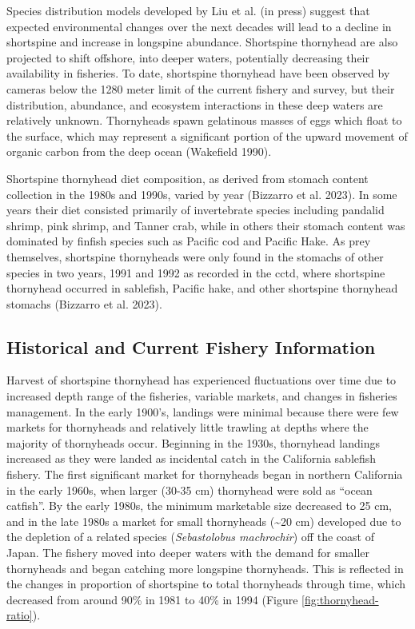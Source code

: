 \documentclass[11pt,
  english,
  letterpaper,
]{article}
\begin{document}
Species distribution models developed by Liu et al. (in press) suggest that expected environmental changes over the next decades will lead to a decline in shortspine and increase in longspine abundance. Shortspine thornyhead are also projected to shift offshore, into deeper waters, potentially decreasing their availability in fisheries. To date, shortspine thornyhead have been observed by cameras below the 1280 meter limit of the current fishery and survey, but their distribution, abundance, and ecosystem interactions in these deep waters are relatively unknown. Thornyheads spawn gelatinous masses of eggs which float to the surface, which may represent a significant portion of the upward movement of organic carbon from the deep ocean (Wakefield 1990).

Shortspine thornyhead diet composition, as derived from stomach content collection in the 1980s and 1990s, varied by year (Bizzarro et al. 2023). In some years their diet consisted primarily of invertebrate species including pandalid shrimp, pink shrimp, and Tanner crab, while in others their stomach content was dominated by finfish species such as Pacific cod and Pacific Hake. As prey themselves, shortspine thornyheads were only found in the stomachs of other species in two years, 1991 and 1992 as recorded in the \gls{cctd}, where shortspine thornyhead occurred in sablefish, Pacific hake, and other shortspine thornyhead stomachs (Bizzarro et al. 2023).

\hypertarget{historical-and-current-fishery-information}{%
\subsection{Historical and Current Fishery Information}\label{historical-and-current-fishery-information}}

Harvest of shortspine thornyhead has experienced fluctuations over time due to increased depth range of the fisheries, variable markets, and changes in fisheries management. In the early 1900's, landings were minimal because there were few markets for thornyheads and relatively little trawling at depths where the majority of thornyheads occur. Beginning in the 1930s, thornyhead landings increased as they were landed as incidental catch in the California sablefish fishery. The first significant market for thornyheads began in northern California in the early 1960s, when larger (30-35 cm) thornyhead were sold as ``ocean catfish''. By the early 1980s, the minimum marketable size decreased to 25 cm, and in the late 1980s a market for small thornyheads (\textasciitilde20 cm) developed due to the depletion of a related species (\emph{Sebastolobus machrochir}) off the coast of Japan. The fishery moved into deeper waters with the demand for smaller thornyheads and began catching more longspine thornyheads. This is reflected in the changes in proportion of shortspine to total thornyheads through time, which decreased from around 90\% in 1981 to 40\% in 1994 (Figure \ref{fig:thornyhead-ratio}).
\end{document}
